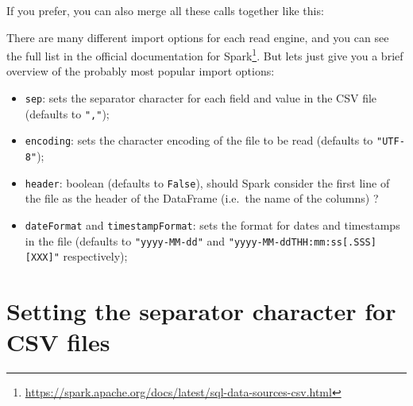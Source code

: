 \documentclass[
  11pt,
  letterpaper,
  DIV=11,
  numbers=noendperiod]{scrreprt}
\newenvironment{Shaded}{\begin{snugshade}}{\end{snugshade}}
\newcommand{\CommentTok}[1]{\textcolor[rgb]{0.37,0.37,0.37}{#1}}
\newcommand{\NormalTok}[1]{\textcolor[rgb]{0.00,0.23,0.31}{#1}}
\newcommand{\StringTok}[1]{\textcolor[rgb]{0.13,0.47,0.30}{#1}}
\providecommand{\tightlist}{%
  \setlength{\itemsep}{0pt}\setlength{\parskip}{0pt}}\usepackage{longtable,booktabs,array}
\begin{document}
If you prefer, you can also merge all these calls together like this:

\begin{Shaded}
\end{Shaded}

There are many different import options for each read engine, and you
can see the full list in the official documentation for
Spark\footnote{\url{https://spark.apache.org/docs/latest/sql-data-sources-csv.html}}.
But lets just give you a brief overview of the probably most popular
import options:

\begin{itemize}
\tightlist
\item
  \texttt{sep}: sets the separator character for each field and value in
  the CSV file (defaults to \texttt{","});
\item
  \texttt{encoding}: sets the character encoding of the file to be read
  (defaults to \texttt{"UTF-8"});
\item
  \texttt{header}: boolean (defaults to \texttt{False}), should Spark
  consider the first line of the file as the header of the DataFrame
  (i.e.~the name of the columns) ?
\item
  \texttt{dateFormat} and \texttt{timestampFormat}: sets the format for
  dates and timestamps in the file (defaults to \texttt{"yyyy-MM-dd"}
  and
  \texttt{"yyyy-MM-dd\textquotesingle{}T\textquotesingle{}HH:mm:ss{[}.SSS{]}{[}XXX{]}"}
  respectively);
\end{itemize}

\hypertarget{setting-the-separator-character-for-csv-files}{%
\section{Setting the separator character for CSV
files}\label{setting-the-separator-character-for-csv-files}}
\end{document}
